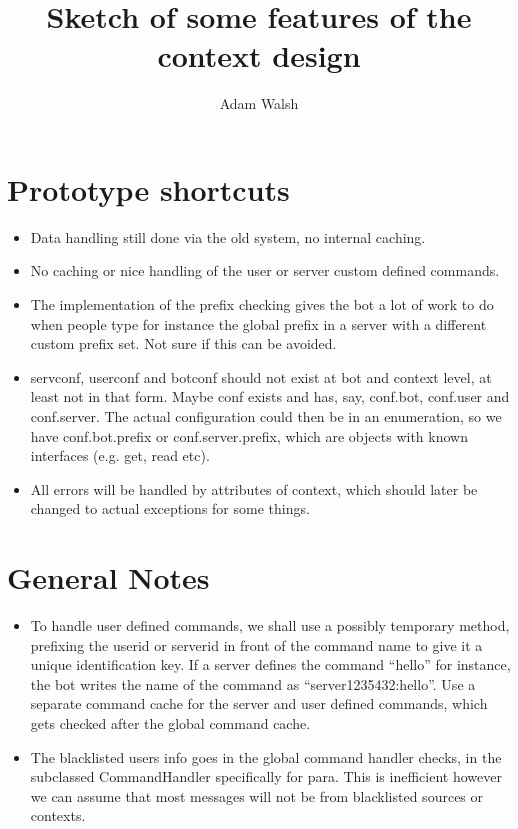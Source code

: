 \documentclass[a4paper]{amsart}
\title{Sketch of some features of the context design}
\author{Adam Walsh}
\begin{document}
\maketitle

\section{Prototype shortcuts}
\begin{itemize}
    \item Data handling still done via the old system, no internal caching.
    \item No caching or nice handling of the user or server custom defined commands.
    \item The implementation of the prefix checking gives the bot a lot of work to do when people type for instance the global prefix in a server with a different custom prefix set. Not sure if this can be avoided.
    \item servconf, userconf and botconf should not exist at bot and context level, at least not in that form. Maybe conf exists and has, say, conf.bot, conf.user and conf.server. The actual configuration could then be in an enumeration, so we have conf.bot.prefix or conf.server.prefix, which are objects with known interfaces (e.g. get, read etc).
    \item All errors will be handled by attributes of context, which should later be changed to actual exceptions for some things.
\end{itemize}


\section{General Notes}
\begin{itemize}
    \item To handle user defined commands, we shall use a possibly temporary method, prefixing the userid or serverid in front of the command name to give it a unique identification key. If a server defines the command ``hello'' for instance, the bot writes the name of the command as ``server1235432:hello''. Use a separate command cache for the server and user defined commands, which gets checked after the global command cache.
    \item The blacklisted users info goes in the global command handler checks, in the subclassed CommandHandler specifically for para. This is inefficient however we can assume that most messages will not be from blacklisted sources or contexts.
\end{itemize}
\end{document}
